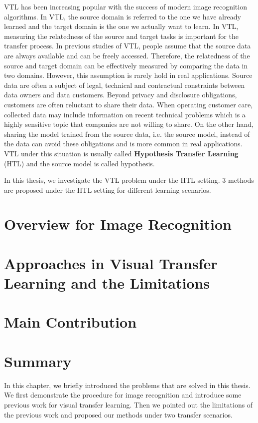 VTL has been increasing popular with the success of modern image recognition algorithms. In VTL, the source domain is referred to the one we have already learned and the target domain is the one we actually want to learn. In VTL, measuring the relatedness of the source and target tasks is important for the transfer process.
In previous studies of VTL, people assume that the source data are always available and can be freely accessed. Therefore, the relatedness of the source and target domain can be effectively measured by comparing the data in two domains. However, this assumption is rarely hold in real applications. Source data are often a subject of legal, technical and contractual constraints between data owners and data customers. Beyond privacy and disclosure obligations, customers are often reluctant to share their data. When operating customer care, collected data may include information on recent technical problems which is a highly sensitive topic that companies are not willing to share.
On the other hand, sharing the model trained from the source data, i.e. the source model, instead of the data can avoid these obligations and is more common in real applications. VTL under this situation is usually called \textbf{Hypothesis Transfer Learning} (HTL) \cite{kuzborskij2013stability} and the source model is called hypothesis.

In this thesis, we investigate the VTL problem under the HTL setting. 3 methods are proposed under the HTL setting for different learning scenarios.

\section{Overview for Image Recognition}\label{sec:intro:over}

\section{Approaches in Visual Transfer Learning and the Limitations}

\section{Main Contribution}

\section{Summary}
In this chapter, we briefly introduced the problems that are solved in this thesis. We first demonstrate the procedure for image recognition and introduce some previous work for visual transfer learning. Then we pointed out the limitations of the previous work and proposed our methods under two transfer scenarios.